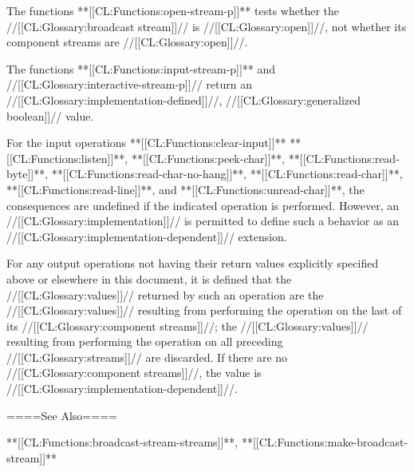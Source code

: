\itemitem{\bull} The functions **[[CL:Functions:open-stream-p]]** tests whether the //[[CL:Glossary:broadcast stream]]// is //[[CL:Glossary:open]]//, not whether its component streams are //[[CL:Glossary:open]]//.

\itemitem{\bull} The functions **[[CL:Functions:input-stream-p]]** and //[[CL:Glossary:interactive-stream-p]]// return an //[[CL:Glossary:implementation-defined]]//, //[[CL:Glossary:generalized boolean]]// value.

\itemitem{\bull} For the input operations **[[CL:Functions:clear-input]]** **[[CL:Functions:listen]]**, **[[CL:Functions:peek-char]]**, **[[CL:Functions:read-byte]]**, **[[CL:Functions:read-char-no-hang]]**, **[[CL:Functions:read-char]]**, **[[CL:Functions:read-line]]**, and **[[CL:Functions:unread-char]]**, the consequences are undefined if the indicated operation is performed. However, an //[[CL:Glossary:implementation]]// is permitted to define such a behavior as an //[[CL:Glossary:implementation-dependent]]// extension. \endlist

For any output operations not having their return values explicitly specified above or elsewhere in this document, it is defined that the //[[CL:Glossary:values]]// returned by such an operation are the //[[CL:Glossary:values]]// resulting from performing the operation on the last of its //[[CL:Glossary:component streams]]//; the //[[CL:Glossary:values]]// resulting from performing the operation on all preceding //[[CL:Glossary:streams]]// are discarded. If there are no //[[CL:Glossary:component streams]]//, the value is //[[CL:Glossary:implementation-dependent]]//.

====See Also====

**[[CL:Functions:broadcast-stream-streams]]**, **[[CL:Functions:make-broadcast-stream]]**

  
